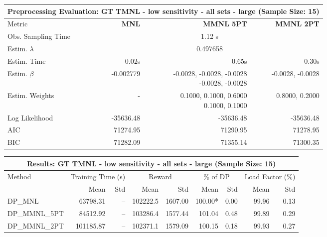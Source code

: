 
\begin{samepage}
\begin{center}
  \small
  \begin{tabular}{l|r|r|r}
    \toprule
    \multicolumn{4}{c}{\textbf{Preprocessing Evaluation: GT TMNL - low sensitivity - all sets - large (Sample Size: 15)}} \\
    \midrule
    Metric & \textbf{MNL} & \textbf{MMNL 5PT} & \textbf{MMNL 2PT} \\
    \midrule
    Obs. Sampling Time & \multicolumn{3}{c}{1.12 s} \\
    Estim. $\lambda$ & \multicolumn{3}{c}{0.497658} \\
    Estim. Time & 0.02s & 0.65s & 0.30s \\
    Estim. $\beta$ & -0.002779 & \makecell[tr]{-0.0028, -0.0028, -0.0028 \\ -0.0028, -0.0028} & -0.0028, -0.0028 \\
    Estim. Weights & - & \makecell[tr]{0.1000, 0.1000, 0.6000 \\ 0.1000, 0.1000} & 0.8000, 0.2000 \\
    Log Likelihood & -35636.48 & -35636.48 & -35636.48 \\
    AIC & 71274.95 & 71290.95 & 71278.95 \\
    BIC & 71282.09 & 71355.14 & 71300.35 \\
    \bottomrule
  \end{tabular}
\end{center}
\begin{center}
  \small
  \begin{tabular}{l|rr|rr|rr|rr}
    \toprule
    \multicolumn{9}{c}{\textbf{Results: GT TMNL - low sensitivity - all sets - large (Sample Size: 15)}} \\
    \midrule
    Method & \multicolumn{2}{c|}{Training Time (s)} & \multicolumn{2}{c|}{Reward} & \multicolumn{2}{c|}{\% of DP} & \multicolumn{2}{c}{Load Factor (\%)} \\
    & Mean & Std & Mean & Std & Mean & Std & Mean & Std \\
    \midrule
    DP\_MNL      & 63798.31 &    -- &   102222.5 &    1607.00 & 100.00* &    0.00 &   99.96 &    0.13 \\
    DP\_MMNL\_5PT & 84512.92 &    -- &   103286.4 &    1577.44 &  101.04 &    0.48 &   99.89 &    0.29 \\
    DP\_MMNL\_2PT & 101185.87 &    -- &   102371.1 &    1579.09 &  100.15 &    0.18 &   99.93 &    0.27 \\

\end{tabular}
\end{center}
\end{samepage}

